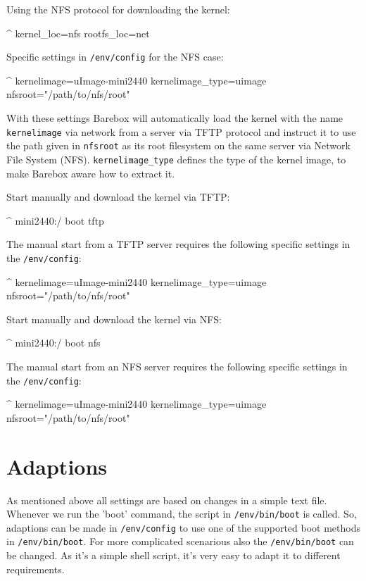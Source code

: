 Using the NFS protocol for downloading the kernel:

\begin{ptxshell}[escapechar=|]{^}
kernel_loc=nfs
rootfs_loc=net
\end{ptxshell}

Specific settings in \texttt{/env/config} for the NFS case:

\begin{ptxshell}[escapechar=|]{^}
kernelimage=uImage-mini2440
kernelimage_type=uimage
nfsroot="/path/to/nfs/root"
\end{ptxshell}

With these settings Barebox will automatically load the kernel with the name
\texttt{kernelimage} via network from a server via TFTP protocol and instruct
it to use the path given in \texttt{nfsroot} as its root filesystem on the
same server via Network File System (NFS).
\texttt{kernelimage\_type} defines the type of the kernel image, to make
Barebox aware how to extract it.

Start manually and download the kernel via TFTP:

\begin{ptxshell}[escapechar=|]{^}
mini2440:/ boot tftp
\end{ptxshell}

The manual start from a TFTP server requires the following specific settings
in the \texttt{/env/config}:

\begin{ptxshell}[escapechar=|]{^}
kernelimage=uImage-mini2440
kernelimage_type=uimage
nfsroot="/path/to/nfs/root"
\end{ptxshell}

Start manually and download the kernel via NFS:

\begin{ptxshell}[escapechar=|]{^}
mini2440:/ boot nfs
\end{ptxshell}

The manual start from an NFS server requires the following specific settings
in the \texttt{/env/config}:

\begin{ptxshell}[escapechar=|]{^}
kernelimage=uImage-mini2440
kernelimage_type=uimage
nfsroot="/path/to/nfs/root"
\end{ptxshell}

\section{Adaptions}

As mentioned above all settings are based on changes in a simple text file.
Whenever we run the 'boot' command, the script in \texttt{/env/bin/boot} is
called. So, adaptions can be made in \texttt{/env/config} to use one of the
supported boot methods in \texttt{/env/bin/boot}. For more complicated
scenarious also the \texttt{/env/bin/boot} can be changed. As it's a simple
shell script, it's very easy to adapt it to different requirements.
